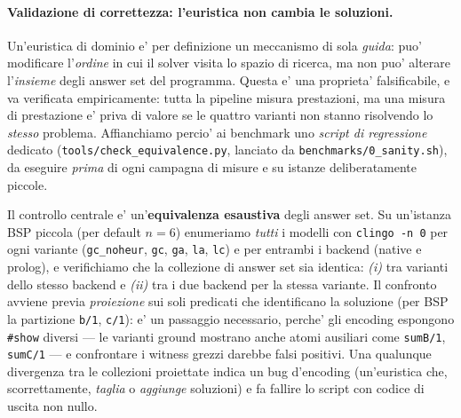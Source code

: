 %


\paragraph{Validazione di correttezza: l'euristica non cambia le soluzioni.}
Un'euristica di dominio e' per definizione un meccanismo di sola \emph{guida}:
puo' modificare l'\emph{ordine} in cui il solver visita lo spazio di ricerca,
ma non puo' alterare l'\emph{insieme} degli answer set del programma. Questa e'
una proprieta' falsificabile, e va verificata empiricamente: tutta la pipeline
misura prestazioni, ma una misura di prestazione e' priva di valore se le quattro
varianti non stanno risolvendo lo \emph{stesso} problema. Affianchiamo percio' ai
benchmark uno \emph{script di regressione} dedicato
(\texttt{tools/check\_equivalence.py}, lanciato da \texttt{benchmarks/0\_sanity.sh}),
da eseguire \emph{prima} di ogni campagna di misure e su istanze deliberatamente
piccole.

Il controllo centrale e' un'\textbf{equivalenza esaustiva} degli answer set. Su
un'istanza BSP piccola (per default $n=6$) enumeriamo \emph{tutti} i modelli con
\texttt{clingo -n 0} per ogni variante (\texttt{gc\_noheur}, \texttt{gc},
\texttt{ga}, \texttt{la}, \texttt{lc}) e per entrambi i backend (native e prolog),
e verifichiamo che la collezione di answer set sia identica:
\emph{(i)} tra varianti dello stesso backend e \emph{(ii)} tra i due backend per
la stessa variante. Il confronto avviene previa \emph{proiezione} sui soli
predicati che identificano la soluzione (per BSP la partizione \texttt{b/1},
\texttt{c/1}): e' un passaggio necessario, perche' gli encoding espongono
\texttt{\#show} diversi --- le varianti ground mostrano anche atomi ausiliari
come \texttt{sumB/1}, \texttt{sumC/1} --- e confrontare i witness grezzi darebbe
falsi positivi. Una qualunque divergenza tra le collezioni proiettate indica un
bug d'encoding (un'euristica che, scorrettamente, \emph{taglia} o \emph{aggiunge}
soluzioni) e fa fallire lo script con codice di uscita non nullo.

